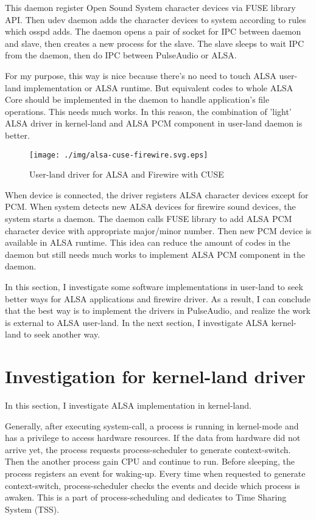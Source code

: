 \documentclass[onecolumn]{article}
\begin{document}
This daemon register Open Sound System character devices via FUSE library API. Then udev daemon adds the character devices to system according to rules which osspd adds. The daemon opens a pair of socket for IPC between daemon and slave, then creates a new process for the slave. The slave sleeps to wait IPC from the daemon, then do IPC between PulseAudio or ALSA.

For my purpose, this way is nice because there's no need to touch ALSA user-land implementation or ALSA runtime. But equivalent codes to whole ALSA Core should be implemented in the daemon to handle application's file operations. This needs much works. In this reason, the combination of 'light' ALSA driver in kernel-land and ALSA PCM component in user-land daemon is better.

\begin{figure}[H]
	\centering
	\texttt{[image: ./img/alsa-cuse-firewire.svg.eps]}
	\caption{{User-land driver for ALSA and Firewire with CUSE}}
	\label{alsa_cuse_firewire}
\end{figure}

When device is connected, the driver registers ALSA character devices except for PCM. When system detects new ALSA devices for firewire sound devices, the system starts a daemon. The daemon calls FUSE library to add ALSA PCM character device with appropriate major/minor number. Then new PCM device is available in ALSA runtime. This idea can reduce the amount of codes in the daemon but still needs much works to implement ALSA PCM component in the daemon.

In this section, I investigate some software implementations in user-land to seek better ways for ALSA applications and firewire driver. As a result, I can conclude that the best way is to implement the drivers in PulseAudio, and realize the work is external to ALSA user-land. In the next section, I investigate ALSA kernel-land to seek another way.


\section{Investigation for kernel-land driver}

In this section, I investigate ALSA implementation in kernel-land.

Generally, after executing system-call, a process is running in kernel-mode and has a privilege to access hardware resources. If the data from hardware did not arrive yet, the process requests process-scheduler to generate context-switch. Then the another process gain CPU and continue to run. Before sleeping, the process registers an event for waking-up. Every time when requested to generate context-switch, process-scheduler checks the events and decide which process is awaken. This is a part of process-scheduling and dedicates to Time Sharing System (TSS).
\end{document}
